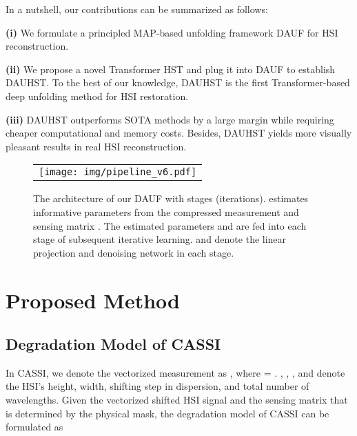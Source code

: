 \documentclass{article}
\begin{document}
In a nutshell, our contributions can be summarized as follows:

\textbf{(i)} We formulate a principled MAP-based  unfolding framework DAUF for HSI reconstruction. 

\textbf{(ii)} We propose a novel Transformer HST and plug it into DAUF to establish DAUHST. To the best of our knowledge, DAUHST is the first Transformer-based deep unfolding method for HSI restoration. 

\textbf{(iii)} DAUHST outperforms SOTA methods by a large margin  while requiring cheaper computational and memory costs. Besides, DAUHST yields more visually pleasant results in real HSI reconstruction. 



\begin{figure*}[t]
	\begin{center}
		\begin{tabular}[t]{c} \hspace{-2.4mm}
			\texttt{[image: img/pipeline\_v6.pdf]}
		\end{tabular}
	\end{center}
	\vspace*{-3mm}
	\caption{\small The architecture of our DAUF with  stages (iterations).  estimates informative parameters from the compressed  measurement  and sensing matrix . The estimated parameters  and  are fed into each stage of subsequent iterative learning.   and  denote the linear projection and denoising network in each stage.}
	\label{fig:pipeline}
	\vspace{-3mm}
\end{figure*}

\vspace{-3mm}
\section{Proposed Method} \label{sec:method}
\vspace{-2mm}
\subsection{Degradation Model of CASSI}
\vspace{-1mm}
In CASSI, we denote the vectorized measurement as , where  = . , , , and  denote the HSI's height, width, shifting step in dispersion, and total number of wavelengths. Given the vectorized shifted HSI signal  and the sensing matrix  that is determined by the physical mask, the degradation model of CASSI can be  formulated as
\end{document}

